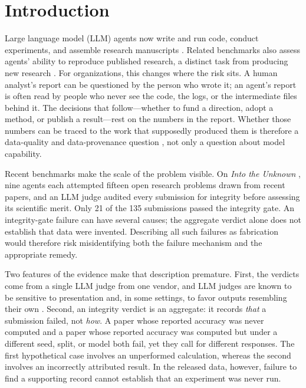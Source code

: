\documentclass[preprint,12pt,authoryear]{elsarticle}
\begin{document}
\section{Introduction}\label{sec:intro}

Large language model (LLM) agents now write and run code, conduct experiments, and assemble research manuscripts \citep{lu2024aiscientist,chen2025mlrbench}. Related benchmarks also assess agents' ability to reproduce published research, a distinct task from producing new research \citep{starace2025paperbench}. For organizations, this changes where the risk sits. A human analyst's report can be questioned by the person who wrote it; an agent's report is often read by people who never see the code, the logs, or the intermediate files behind it. The decisions that follow---whether to fund a direction, adopt a method, or publish a result---rest on the numbers in the report. Whether those numbers can be traced to the work that supposedly produced them is therefore a data-quality and data-provenance question \citep{wang1996dataquality,simmhan2005provenance}, not only a question about model capability.

Recent benchmarks make the scale of the problem visible. On \emph{Into the Unknown} \citep{kim2026unknown}, nine agents each attempted fifteen open research problems drawn from recent papers, and an LLM judge audited every submission for integrity before assessing its scientific merit. Only 21 of the 135 submissions passed the integrity gate. An integrity-gate failure can have several causes; the aggregate verdict alone does not establish that data were invented. Describing all such failures as fabrication would therefore risk misidentifying both the failure mechanism and the appropriate remedy.

Two features of the evidence make that description premature. First, the verdicts come from a single LLM judge from one vendor, and LLM judges are known to be sensitive to presentation and, in some settings, to favor outputs resembling their own \citep{zheng2023judge,panickssery2024selfpref}. Second, an integrity verdict is an aggregate: it records \emph{that} a submission failed, not \emph{how}. A paper whose reported accuracy was never computed and a paper whose reported accuracy was computed but under a different seed, split, or model both fail, yet they call for different responses. The first hypothetical case involves an unperformed calculation, whereas the second involves an incorrectly attributed result. In the released data, however, failure to find a supporting record cannot establish that an experiment was never run.
\end{document}

